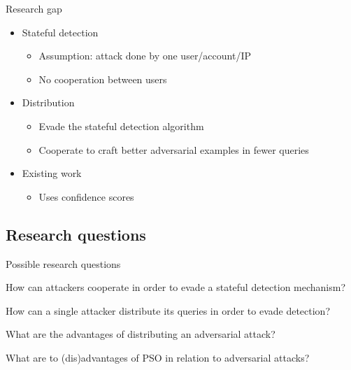 \documentclass[11pt,t]{beamer}
\begin{document}
\begin{frame}{Research gap}
\begin{itemize}
	\item Stateful detection
	\begin{itemize}
		\item Assumption: attack done by \alert{one} user/account/IP
		\item No cooperation between users
	\end{itemize}
	
	\item Distribution
	\begin{itemize}
		\item Evade the stateful detection algorithm
		\item Cooperate to craft better adversarial examples in fewer queries
	\end{itemize}
	
	\item Existing work
	\begin{itemize}
		\item Uses confidence scores \cite{10.1007/978-3-030-59013-0_22, s20247158}
	\end{itemize}
\end{itemize}
\end{frame}

\subsection{Research questions}
\begin{frame}{Possible research questions}
	\begin{exampleblock}
	{How can attackers cooperate in order to evade a stateful detection mechanism?}
	\end{exampleblock}
	\begin{exampleblock}
	{How can a single attacker distribute its queries in order to evade detection?}
	\end{exampleblock}
	\begin{exampleblock}
	{What are the advantages of distributing an adversarial attack?}
	\end{exampleblock}
	\begin{exampleblock}
	{What are to (dis)advantages of PSO in relation to adversarial attacks?}
	\end{exampleblock}
\end{frame}
\end{document}
